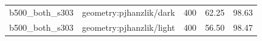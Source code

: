 \begin{longtable}{l>{\raggedright\arraybackslash}p{.42\linewidth}rrr}
b500\_\allowbreak{}both\_\allowbreak{}s303 & %
geometry:pjhanzlik/dark & %
400 & %
62.25 & %
98.63 \\ %

b500\_\allowbreak{}both\_\allowbreak{}s303 & %
geometry:pjhanzlik/light & %
400 & %
56.50 & %
98.47 \\ %


\end{longtable}
